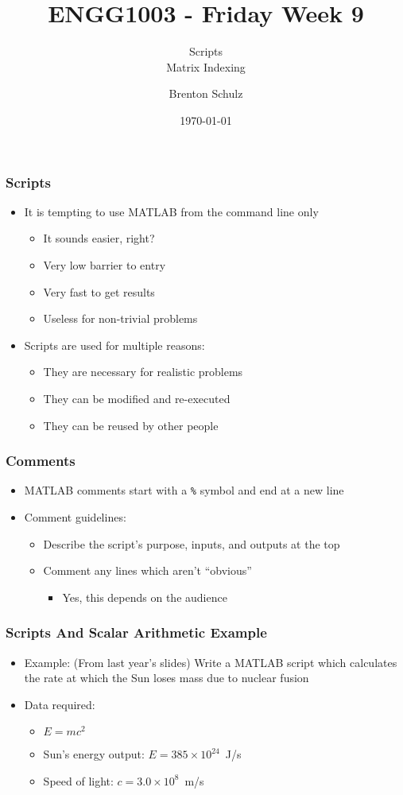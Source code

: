 \documentclass[14pt]{beamer}
\title{ENGG1003 - Friday Week 9}
\subtitle{Scripts\\Matrix Indexing}
\author{Brenton Schulz}
\institute{University of Newcastle}
\date{\today}
\begin{document}
\titlepage

\begin{frame}
\frametitle{Scripts}
\begin{itemize}
\item It is tempting to use MATLAB from the command line only
	\begin{itemize}
		\item It sounds easier, right?
		\item Very low barrier to entry
		\item Very fast to get results
		\pause
		\item Useless for non-trivial problems
	\end{itemize}
\pause
\item Scripts are used for multiple reasons:
	\begin{itemize}
		\item They are necessary for realistic problems
		\item They can be modified and re-executed
		\item They can be reused by other people
	\end{itemize}
\end{itemize}
\end{frame}

\begin{frame}
\frametitle{Comments}
\begin{itemize}
\item MATLAB comments start with a \texttt{\%} symbol and end at a new line
\item Comment guidelines:
	\begin{itemize}
		\item Describe the script's purpose, inputs, and outputs at the top
		\item Comment any lines which aren't ``obvious''
			\begin{itemize}
				\item Yes, this depends on the audience
			\end{itemize}
	\end{itemize}
\end{itemize}
\end{frame}

\begin{frame}
\frametitle{Scripts And Scalar Arithmetic Example}
\begin{itemize}
\item Example: (From last year's slides) Write a MATLAB script which calculates the rate at which the Sun loses mass due to nuclear fusion
\item Data required:
	\begin{itemize}
		\item $E=mc^2$
		\item Sun's energy output: $E=385 \times 10^{24}$~J/s
		\item Speed of light: $c=3.0 \times 10^8$~m/s
	\end{itemize}
\end{itemize}
\end{frame}
\end{document}
